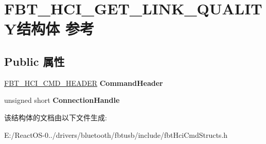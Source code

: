 \hypertarget{struct_f_b_t___h_c_i___g_e_t___l_i_n_k___q_u_a_l_i_t_y}{}\section{F\+B\+T\+\_\+\+H\+C\+I\+\_\+\+G\+E\+T\+\_\+\+L\+I\+N\+K\+\_\+\+Q\+U\+A\+L\+I\+T\+Y结构体 参考}
\label{struct_f_b_t___h_c_i___g_e_t___l_i_n_k___q_u_a_l_i_t_y}
\subsection*{Public 属性}
\begin{DoxyCompactItemize}
\item 
\mbox{\label{struct_f_b_t___h_c_i___g_e_t___l_i_n_k___q_u_a_l_i_t_y_af152eaf7a2920c9e14a5c03353bff9c3}} 
\hyperlink{struct_f_b_t___h_c_i___c_m_d___h_e_a_d_e_r}{F\+B\+T\+\_\+\+H\+C\+I\+\_\+\+C\+M\+D\+\_\+\+H\+E\+A\+D\+ER} {\bfseries Command\+Header}
\item 
\mbox{\label{struct_f_b_t___h_c_i___g_e_t___l_i_n_k___q_u_a_l_i_t_y_a6e166110c32dd315c57093d3df9899e3}} 
unsigned short {\bfseries Connection\+Handle}
\end{DoxyCompactItemize}


该结构体的文档由以下文件生成\+:\begin{DoxyCompactItemize}
\item 
E\+:/\+React\+O\+S-\/0../drivers/bluetooth/fbtusb/include/fbt\+Hci\+Cmd\+Structs.\+h\end{DoxyCompactItemize}
